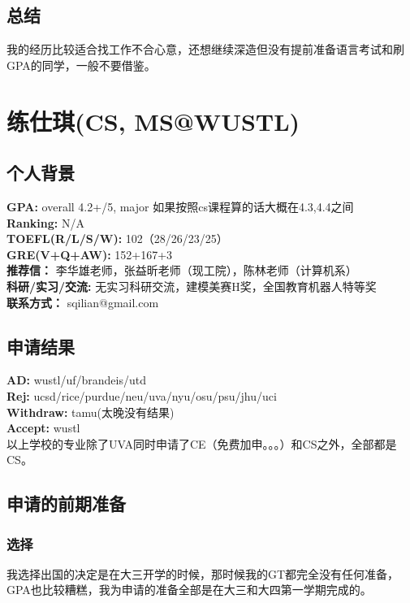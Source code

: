 \documentclass[a4paper,UTF8]{book}
\begin{document}
    \subsection*{总结}
    我的经历比较适合找工作不合心意，还想继续深造但没有提前准备语言考试和刷GPA的同学，一般不要借鉴。

\clearpage
\section{练仕琪(CS, MS@WUSTL)}
    \subsection*{个人背景}
        \textbf{GPA:} overall 4.2+/5, major 如果按照cs课程算的话大概在4.3,4.4之间\\
        \textbf{Ranking:} N/A\\
        \textbf{TOEFL(R/L/S/W):} 102（28/26/23/25）\\
        \textbf{GRE(V+Q+AW):} 152+167+3\\
        \textbf{推荐信：} 李华雄老师，张益昕老师（现工院），陈林老师（计算机系）\\
        \textbf{科研/实习/交流:} 无实习科研交流，建模美赛H奖，全国教育机器人特等奖\\ 
        \textbf{联系方式：} sqilian@gmail.com

    \subsection*{申请结果}
        \textbf{AD:} wustl/uf/brandeis/utd\\
        \textbf{Rej:} ucsd/rice/purdue/neu/uva/nyu/osu/psu/jhu/uci\\
        \textbf{Withdraw:} tamu(太晚没有结果)\\
        \textbf{Accept:} wustl\\
        以上学校的专业除了UVA同时申请了CE（免费加申。。。）和CS之外，全部都是CS。

    \subsection*{申请的前期准备}
        \subsubsection*{选择}
        我选择出国的决定是在大三开学的时候，那时候我的GT都完全没有任何准备，GPA也比较糟糕，我为申请的准备全部是在大三和大四第一学期完成的。
\end{document}
